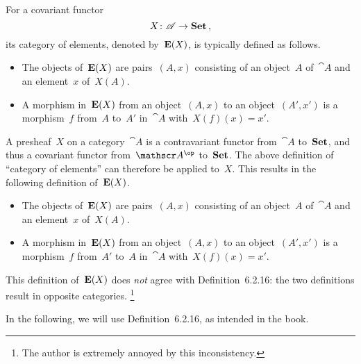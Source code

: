 \subsection{}


\begin{warning}
	For a covariant functor
	\[
		X \colon \mathscr{A} \to \mathbf{Set} \,,
	\]
	its category of elements, denoted by~$\operatorname{\mathbf{E}}(X)$, is typically defined as follows.
	\begin{itemize}

		\item
			The objects of~$\operatorname{\mathbf{E}}(X)$ are pairs~$(A, x)$ consisting of an object~$A$ of~$\cat{A}$ and an element~$x$ of~$X(A)$.

		\item
			A morphism in~$\operatorname{\mathbf{E}}(X)$ from an object~$(A, x)$ to an object~$(A', x')$ is a morphism~$f$ from~$A$ to~$A'$ in~$\cat{A}$ with~$X(f)(x) = x'$.

	\end{itemize}
	A presheaf~$X$ on a category~$\cat{A}$ is a contravariant functor from~$\cat{A}$ to~$\mathbf{Set}$, and thus a covariant functor from~$\cat{A}^{\op}$ to~$\mathbf{Set}$.
	The above definition of \enquote{category of elements} can therefore be applied to~$X$.
	This results in the following definition of~$\operatorname{\mathbf{E}}(X)$.
	\begin{itemize}

		\item
			The objects of~$\operatorname{\mathbf{E}}(X)$ are pairs~$(A, x)$ consisting of an object~$A$ of~$\cat{A}$ and an element~$x$ of~$X(A)$.

		\item
			A morphism in~$\operatorname{\mathbf{E}}(X)$ from an object~$(A, x)$ to an object~$(A', x')$ is a morphism~$f$ from~$A'$ to~$A$ in~$\cat{A}$ with~$X(f)(x) = x'$.

	\end{itemize}
	This definition of~$\operatorname{\mathbf{E}}(X)$ does \emph{not} agree with Definition~6.2.16:
	the two definitions result in opposite categories.%
	\footnote{
		The author is extremely annoyed by this inconsistency.
	}

	In the following, we will use Definition~6.2.16, as intended in the book.
\end{warning}



